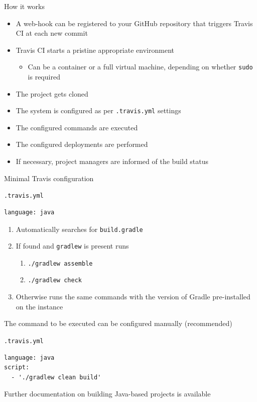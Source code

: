 \documentclass[presentation]{beamer}
\begin{document}
\begin{frame}[fragile]{How it works}
	\begin{itemize}
		\item A web-hook can be registered to your GitHub repository that triggers Travis CI at each new commit
		\item Travis CI starts a pristine appropriate environment
		\begin{itemize}
			\item Can be a container or a full virtual machine, depending on whether \texttt{sudo} is required \cite{travisbuild}
		\end{itemize}
		\item The project gets cloned
		\item The system is configured as per \texttt{.travis.yml} settings
		\item The configured commands are executed
		\item The configured deployments are performed
		\item If necessary, project managers are informed of the build status
	\end{itemize}
\end{frame}

\begin{frame}[fragile]{Minimal Travis configuration}
	\begin{block}{\texttt{.travis.yml}}
		\begin{verbatim}
language: java
		\end{verbatim}
	\end{block}
	\begin{enumerate}
		\item Automatically searches for \texttt{build.gradle}
		\item If found and \texttt{gradlew} is present runs
		\begin{enumerate}
			\item \texttt{./gradlew assemble}
			\item \texttt{./gradlew check}
		\end{enumerate}
		\item Otherwise runs the same commands with the version of Gradle pre-installed on the instance
	\end{enumerate}
	The command to be executed can be configured manually (recommended)
	\begin{block}{\texttt{.travis.yml}}
		\begin{verbatim}
language: java
script:
  - './gradlew clean build'
		\end{verbatim}
	\end{block}
	Further documentation on building Java-based projects is available \cite{travisjava}
\end{frame}
\end{document}
